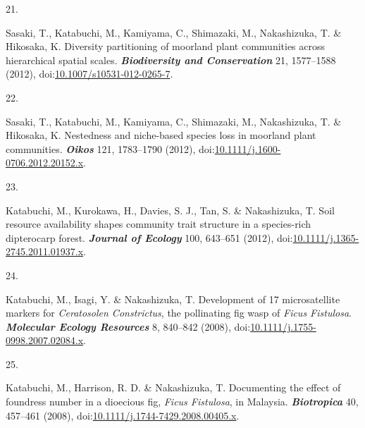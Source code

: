 \documentclass[
]{article}
\newlength{\cslhangindent}
\newlength{\csllabelwidth}
\newlength{\cslentryspacingunit} %
\newenvironment{CSLReferences}[2] %
 {%
  \setlength{\parindent}{0pt}
  \ifodd #1
  \let\oldpar\par
  \def\par{\hangindent=\cslhangindent\oldpar}
  \fi
  \setlength{\parskip}{#2\cslentryspacingunit}
 }%
 {}
\newcommand{\CSLLeftMargin}[1]{\parbox[t]{\csllabelwidth}{#1}}
\newcommand{\CSLRightInline}[1]{\parbox[t]{\linewidth - \csllabelwidth}{#1}\break}
\begin{document}
\begin{CSLReferences}{0}{0}
\leavevmode{}%
\CSLLeftMargin{21. }
\CSLRightInline{Sasaki, T., Katabuchi, M., Kamiyama, C., Shimazaki, M.,
Nakashizuka, T. \& Hikosaka, K. Diversity partitioning of moorland plant
communities across hierarchical spatial scales.
\textbf{\emph{Biodiversity and Conservation}} 21, 1577--1588 (2012),
doi:\href{https://doi.org/10.1007/s10531-012-0265-7}{10.1007/s10531-012-0265-7}.}

\leavevmode{}%
\CSLLeftMargin{22. }
\CSLRightInline{Sasaki, T., Katabuchi, M., Kamiyama, C., Shimazaki, M.,
Nakashizuka, T. \& Hikosaka, K. Nestedness and niche-based species loss
in moorland plant communities. \textbf{\emph{Oikos}} 121, 1783--1790
(2012),
doi:\href{https://doi.org/10.1111/j.1600-0706.2012.20152.x}{10.1111/j.1600-0706.2012.20152.x}.}

\leavevmode{}%
\CSLLeftMargin{23. }
\CSLRightInline{Katabuchi, M., Kurokawa, H., Davies, S. J., Tan, S. \&
Nakashizuka, T. Soil resource availability shapes community trait
structure in a species-rich dipterocarp forest. \textbf{\emph{Journal of
Ecology}} 100, 643--651 (2012),
doi:\href{https://doi.org/10.1111/j.1365-2745.2011.01937.x}{10.1111/j.1365-2745.2011.01937.x}.}

\leavevmode{}%
\CSLLeftMargin{24. }
\CSLRightInline{Katabuchi, M., Isagi, Y. \& Nakashizuka, T. Development
of 17 microsatellite markers for {\emph{Ceratosolen Constrictus}}, the
pollinating fig wasp of {\emph{Ficus Fistulosa}}.
\textbf{\emph{Molecular Ecology Resources}} 8, 840--842 (2008),
doi:\href{https://doi.org/10.1111/j.1755-0998.2007.02084.x}{10.1111/j.1755-0998.2007.02084.x}.}

\leavevmode{}%
\CSLLeftMargin{25. }
\CSLRightInline{Katabuchi, M., Harrison, R. D. \& Nakashizuka, T.
Documenting the effect of foundress number in a dioecious fig,
{\emph{Ficus Fistulosa}}, in {Malaysia}. \textbf{\emph{Biotropica}} 40,
457--461 (2008),
doi:\href{https://doi.org/10.1111/j.1744-7429.2008.00405.x}{10.1111/j.1744-7429.2008.00405.x}.}

\end{CSLReferences}
\end{document}
